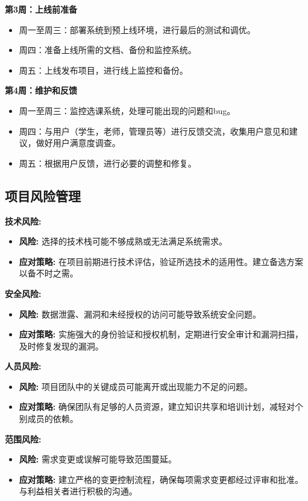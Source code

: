 \documentclass{article}
\begin{document}
\textbf{第3周：上线前准备}
\begin{itemize}
	\item 周一至周三：部署系统到预上线环境，进行最后的测试和调优。
	\item 周四：准备上线所需的文档、备份和监控系统。
	\item 周五：上线发布项目，进行线上监控和备份。
\end{itemize}

\textbf{第4周：维护和反馈}
\begin{itemize}
	\item 周一至周三：监控选课系统，处理可能出现的问题和bug。
	\item 周四：与用户（学生，老师，管理员等）进行反馈交流，收集用户意见和建议，做好用户满意度调查。
	\item 周五：根据用户反馈，进行必要的调整和修复。
\end{itemize}
\subsection{项目风险管理}
\textbf{技术风险:}
\begin{itemize}
	\item \textbf{风险:} 选择的技术栈可能不够成熟或无法满足系统需求。
	\item \textbf{应对策略:} 在项目前期进行技术评估，验证所选技术的适用性。建立备选方案以备不时之需。
\end{itemize}

\textbf{安全风险:}
\begin{itemize}
	\item \textbf{风险:} 数据泄露、漏洞和未经授权的访问可能导致系统安全问题。
	\item \textbf{应对策略:} 实施强大的身份验证和授权机制，定期进行安全审计和漏洞扫描，及时修复发现的漏洞。
\end{itemize}

\textbf{人员风险:}
\begin{itemize}
	\item \textbf{风险:} 项目团队中的关键成员可能离开或出现能力不足的问题。
	\item \textbf{应对策略:} 确保团队有足够的人员资源，建立知识共享和培训计划，减轻对个别成员的依赖。
\end{itemize}

\textbf{范围风险:}
\begin{itemize}
	\item \textbf{风险:} 需求变更或误解可能导致范围蔓延。
	\item \textbf{应对策略:} 建立严格的变更控制流程，确保每项需求变更都经过评审和批准。与利益相关者进行积极的沟通。
\end{itemize}
\end{document}
